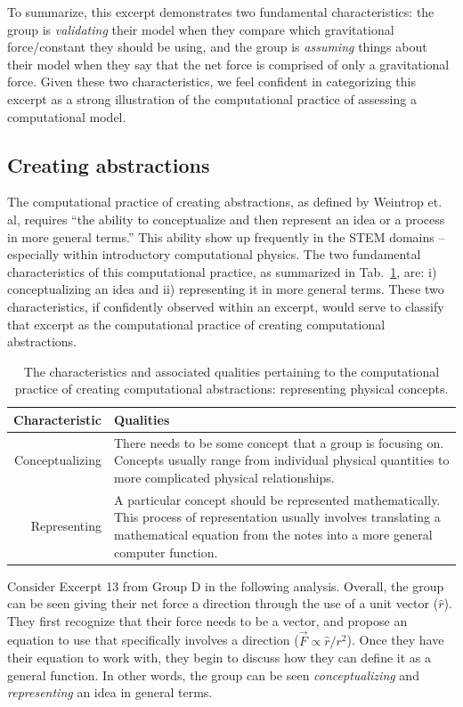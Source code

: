 \documentclass{msuphddissertation}
\begin{document}
\begin{doublespace}
To summarize, this excerpt demonstrates two fundamental characteristics: the group is \textit{validating} their model when they compare which gravitational force/constant they should be using, and the group is \textit{assuming} things about their model when they say that the net force is comprised of only a gravitational force.  Given these two characteristics, we feel confident in categorizing this excerpt as a strong illustration of the computational practice of assessing a computational model.

\subsection{Creating abstractions}\label{CH5:SecCreatingAbstractions}

The computational practice of creating abstractions, as defined by Weintrop et. al, requires ``the ability to conceptualize and then represent an idea or a process in more general terms.''  This ability show up frequently in the STEM domains -- especially within introductory computational physics.  The two fundamental characteristics of this computational practice, as summarized in Tab.~\ref{CH5:CreatingAbstractions}, are: i) conceptualizing an idea and ii) representing it in more general terms.  These two characteristics, if confidently observed within an excerpt, would serve to classify that excerpt as the computational practice of creating computational abstractions.

\begin{table}
\begin{tabular}{r|p{}}
Characteristic & Qualities \\\hline\hline
Conceptualizing & There needs to be some concept that a group is focusing on.  Concepts usually range from individual physical quantities to more complicated physical relationships.\\
Representing & A particular concept should be represented mathematically.  This process of representation usually involves translating a mathematical equation from the notes into a more general computer function.
\end{tabular}\caption{The characteristics and associated qualities pertaining to the computational practice of creating computational abstractions: representing physical concepts.}\label{CH5:CreatingAbstractions}
\end{table}

Consider Excerpt 13 from Group D in the following analysis.  Overall, the group can be seen giving their net force a direction through the use of a unit vector ($\hat{r}$).  They first recognize that their force needs to be a vector, and propose an equation to use that specifically involves a direction ($\vec{F}\propto\hat{r}/r^{2}$).  Once they have their equation to work with, they begin to discuss how they can define it as a general function.  In other words, the group can be seen \textit{conceptualizing} and \textit{representing} an idea in general terms.


\end{doublespace}
\end{document}
